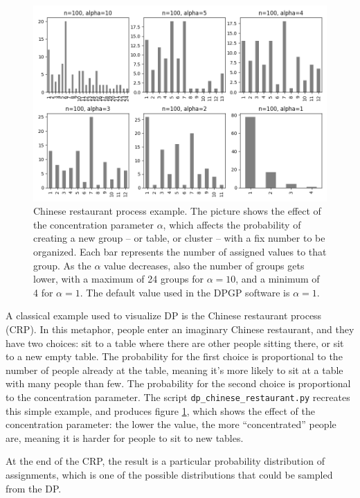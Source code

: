 \begin{figure}[!ht]
    \centering
    \includegraphics[width=.9\textwidth]{src/chinese_restaurant.png}
    \caption[Chinese restaurant process example]{Chinese restaurant process example. The picture shows the effect of the concentration parameter $\alpha$, which affects the probability of creating a new group -- or table, or cluster -- with a fix number to be organized. Each bar represents the number of assigned values to that group. As the $\alpha$ value decreases, also the number of groups gets lower, with a maximum of 24 groups for $\alpha=10$, and a minimum of 4 for $\alpha=1$. The default value used in the DPGP software is $\alpha=1$.}\label{intro:crp}
\end{figure}

A classical example used to visualize DP is the Chinese restaurant process (CRP). In this metaphor, people enter an imaginary Chinese restaurant, and they have two choices: sit to a table where there are other people sitting there, or sit to a new empty table. The probability for the first choice is proportional to the number of people already at the table, meaning it's more likely to sit at a table with many people than few. The probability for the second choice is proportional to the concentration parameter. The script \texttt{dp\_chinese\_restaurant.py} recreates this simple example, and produces figure \ref{intro:crp}, which shows the effect of the concentration parameter: the lower the value, the more ``concentrated'' people are, meaning it is harder for people to sit to new tables.

At the end of the CRP, the result is a particular probability distribution of assignments, which is one of the possible distributions that could be sampled from the DP.

